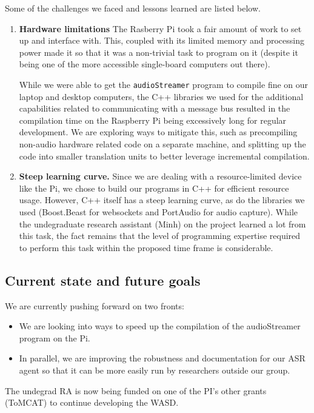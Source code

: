 Some of the challenges we faced and lessons learned are listed below.

\begin{enumerate}

    \item \textbf{Hardware limitations} The Rasberry Pi took a fair amount of
        work to set up and interface with. This, coupled with its limited
        memory and processing power made it so that it was a non-trivial task
        to program on it (despite it being one of the more accessible
        single-board computers out there). 

        While we were able to get the
        \texttt{audioStreamer} program to compile fine on our laptop and
        desktop computers, the C++ libraries we used for the additional
        capabilities related to communicating with a message bus resulted in
        the compilation time on the Raspberry Pi being excessively long for
        regular development. We are exploring ways to mitigate this, such as
        precompiling non-audio hardware related code on a separate machine, and
        splitting up the code into smaller translation units to better leverage
        incremental compilation.

    \item \textbf{Steep learning curve.} Since we are dealing with a
        resource-limited device like the Pi, we chose to build our programs in
        C++ for efficient resource usage.  However, C++ itself has a steep
        learning curve, as do the libraries we used (Boost.Beast for websockets
        and PortAudio for audio capture).  While the undegraduate research
        assistant (Minh) on the project learned a lot from this task, the fact
        remains that the level of programming expertise required to perform
        this task within the proposed time frame is considerable.

        
\end{enumerate}


\subsection{Current state and future goals}

We are currently pushing forward on two fronts:

\begin{itemize}

    \item We are looking into ways to speed up the compilation of the
        audioStreamer program on the Pi.

    \item In parallel, we are improving the robustness and documentation for
        our ASR agent so that it can be more easily run by researchers outside
        our group.

\end{itemize}

The undegrad RA is now being funded on one of the PI's other grants (ToMCAT) to
continue developing the WASD.
